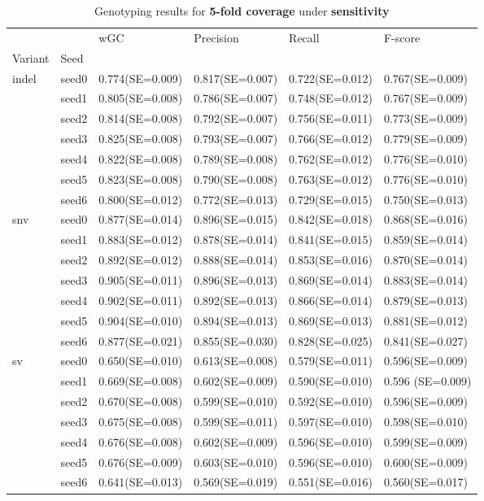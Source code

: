 \documentclass{PHlab-thesis}
\begin{document}
\begin{table}[ht!]
\begin{tabular*}{\textwidth}{@{\extracolsep{\fill}}llllll@{\extracolsep{\fill}}}
\toprule
   &         &               wGC &         Precision &            Recall &           F-score \\
Variant & Seed &                   &                   &                   &                   \\
\midrule
indel & seed0  & 0.774(SE=0.009) & 0.817(SE=0.007) & 0.722(SE=0.012) & 0.767(SE=0.009) \\
   & seed1 & 0.805(SE=0.008) & 0.786(SE=0.007) & 0.748(SE=0.012)&0.767(SE=0.009)\\
   & seed2 & 0.814(SE=0.008) & 0.792(SE=0.007) &0.756(SE=0.011) & 0.773(SE=0.009)\\
   & seed3 & 0.825(SE=0.008)& 0.793(SE=0.007) & 0.766(SE=0.012) &0.779(SE=0.009)\\
   & seed4 & 0.822(SE=0.008) & 0.789(SE=0.008) & 0.762(SE=0.012)&  0.776(SE=0.010)\\
   & seed5 & 0.823(SE=0.008)&  0.790(SE=0.008)&  0.763(SE=0.012)&  0.776(SE=0.010)\\
   & seed6 & 0.800(SE=0.012)&  0.772(SE=0.013)&  0.729(SE=0.015)&  0.750(SE=0.013)\\
\midrule
snv & seed0  & 0.877(SE=0.014)  & 0.896(SE=0.015)  & 0.842(SE=0.018)  & 0.868(SE=0.016) \\
   & seed1 &0.883(SE=0.012)&0.878(SE=0.014)&0.841(SE=0.015)&0.859(SE=0.014)\\
   & seed2 &0.892(SE=0.012)&0.888(SE=0.014)& 0.853(SE=0.016)& 0.870(SE=0.014)\\
   & seed3 & 0.905(SE=0.011) & 0.896(SE=0.013)& 0.869(SE=0.014) & 0.883(SE=0.014)\\
   & seed4 & 0.902(SE=0.011)&  0.892(SE=0.013)&  0.866(SE=0.014)&  0.879(SE=0.013)\\
   & seed5 & 0.904(SE=0.010) & 0.894(SE=0.013)&  0.869(SE=0.013) &  0.881(SE=0.012)\\
   & seed6 &  0.877(SE=0.021)&  0.855(SE=0.030)&  0.828(SE=0.025)&  0.841(SE=0.027) \\
\midrule
sv & seed0  & 0.650(SE=0.010) & 0.613(SE=0.008)  & 0.579(SE=0.011)  & 0.596(SE=0.009) \\
   & seed1 & 0.669(SE=0.008) & 0.602(SE=0.009) & 0.590(SE=0.010)&0.596 (SE=0.009)\\
   & seed2 & 0.670(SE=0.008) & 0.599(SE=0.010) & 0.592(SE=0.010) & 0.596(SE=0.009)\\
   & seed3 & 0.675(SE=0.008) & 0.599(SE=0.011) & 0.597(SE=0.010) & 0.598(SE=0.010)\\
   & seed4 & 0.676(SE=0.008) &   0.602(SE=0.009)&  0.596(SE=0.010)&  0.599(SE=0.009)\\
   & seed5 & 0.676(SE=0.009) &  0.603(SE=0.010) &  0.596(SE=0.010)&  0.600(SE=0.009)\\
   & seed6 & 0.641(SE=0.013)&  0.569(SE=0.019)&  0.551(SE=0.016)&  0.560(SE=0.017)\\
\bottomrule
\end{tabular*}
\caption{Genotyping results for \textbf{5-fold coverage} under \textbf{sensitivity} \label{table:sensitivity-5x}}
\end{table}
\end{document}
